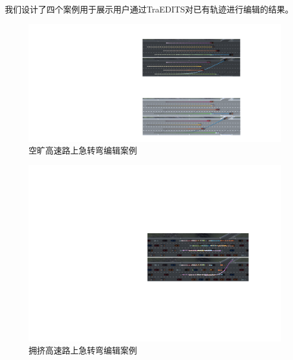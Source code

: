 我们设计了四个案例用于展示用户通过TraEDITS对已有轨迹进行编辑的结果。


\begin{figure}[!tbh]
\centering
\includegraphics[width=\columnwidth]{figure/traedits/editing ramp 5.pdf}
\caption[空旷高速路上急转弯编辑案例]{
空旷高速路上急转弯编辑案例
}
\label{fig:traedits_editramp}
\end{figure}

\begin{figure}[!tbh]
\centering
\includegraphics[width=\columnwidth]{figure/traedits/editing crowded 5.pdf}
\caption[拥挤高速路上急转弯编辑案例]{
拥挤高速路上急转弯编辑案例
}
\label{fig:traedits_editcrowded}
\end{figure}

